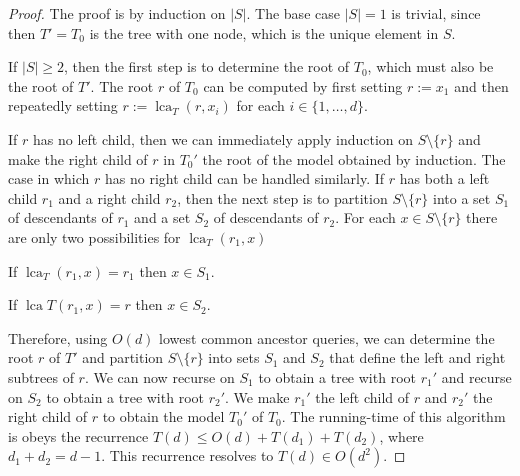 \documentclass{patmorin}
\DeclareMathOperator{\lca}{lca}
\begin{document}
\begin{proof}
  The proof is by induction on $|S|$.  The base case $|S|=1$ is trivial, since then $T'=T_0$ is the tree with one node, which is the unique element in $S$.

  If $|S|\ge 2$, then the first step is to determine the root of $T_0$, which must also be the root of $T'$.  The root $r$ of $T_0$ can be computed by first setting $r:=x_1$ and then repeatedly setting $r:=\lca_{T}(r,x_i)$ for each $i\in\{1,\ldots,d\}$.

  If $r$ has no left child, then we can immediately apply induction on $S\setminus\{r\}$ and make the right child of $r$ in $T_0'$ the root of the model obtained by induction.  The case in which $r$ has no right child can be handled similarly. If $r$ has both a left child $r_1$ and a right child $r_2$, then the next step is to partition $S\setminus\{r\}$ into a set $S_1$ of descendants of $r_1$ and a set $S_2$ of descendants of $r_2$.   For each $x\in S\setminus\{r\}$ there are only two possibilities for $\lca_{T}(r_1,x)$
  \begin{compactenum}
    \item If $\lca_{T}(r_1,x)=r_1$ then $x\in S_1$.
    \item If $\lca{T}(r_1,x)=r$ then $x\in S_2$.
  \end{compactenum}
  Therefore, using $O(d)$ lowest common ancestor queries, we can determine the root $r$ of $T'$ and partition $S\setminus\{r\}$ into sets $S_1$ and $S_2$ that define the left and right subtrees of $r$.  We can now recurse on $S_1$ to obtain a tree with root $r_1'$ and recurse on $S_2$ to obtain a tree with root $r_2'$.  We make $r_1'$ the left child of $r$ and $r_2'$ the right child of $r$ to obtain the model $T_0'$ of $T_0$.  The running-time of this  algorithm is obeys the recurrence $T(d)\le O(d)+T(d_1) + T(d_2)$, where $d_1 + d_2 = d-1$.  This recurrence resolves to $T(d)\in O(d^2)$.
\end{proof}
\end{document}
